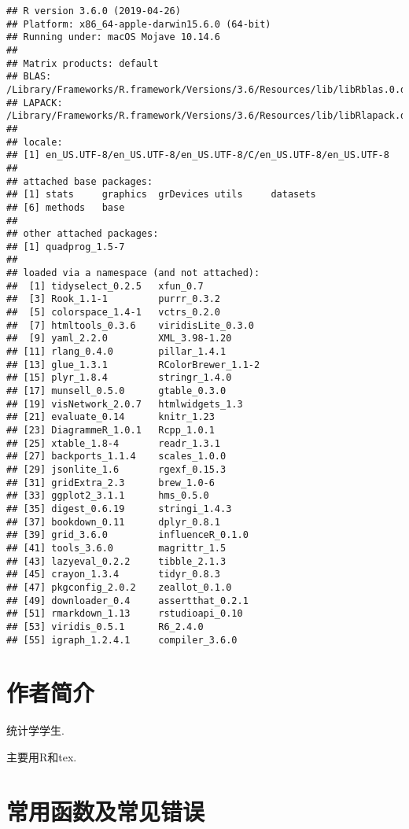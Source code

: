 \documentclass[]{ctexbook}
\begin{document}
\begin{verbatim}
## R version 3.6.0 (2019-04-26)
## Platform: x86_64-apple-darwin15.6.0 (64-bit)
## Running under: macOS Mojave 10.14.6
## 
## Matrix products: default
## BLAS:   /Library/Frameworks/R.framework/Versions/3.6/Resources/lib/libRblas.0.dylib
## LAPACK: /Library/Frameworks/R.framework/Versions/3.6/Resources/lib/libRlapack.dylib
## 
## locale:
## [1] en_US.UTF-8/en_US.UTF-8/en_US.UTF-8/C/en_US.UTF-8/en_US.UTF-8
## 
## attached base packages:
## [1] stats     graphics  grDevices utils     datasets 
## [6] methods   base     
## 
## other attached packages:
## [1] quadprog_1.5-7
## 
## loaded via a namespace (and not attached):
##  [1] tidyselect_0.2.5   xfun_0.7          
##  [3] Rook_1.1-1         purrr_0.3.2       
##  [5] colorspace_1.4-1   vctrs_0.2.0       
##  [7] htmltools_0.3.6    viridisLite_0.3.0 
##  [9] yaml_2.2.0         XML_3.98-1.20     
## [11] rlang_0.4.0        pillar_1.4.1      
## [13] glue_1.3.1         RColorBrewer_1.1-2
## [15] plyr_1.8.4         stringr_1.4.0     
## [17] munsell_0.5.0      gtable_0.3.0      
## [19] visNetwork_2.0.7   htmlwidgets_1.3   
## [21] evaluate_0.14      knitr_1.23        
## [23] DiagrammeR_1.0.1   Rcpp_1.0.1        
## [25] xtable_1.8-4       readr_1.3.1       
## [27] backports_1.1.4    scales_1.0.0      
## [29] jsonlite_1.6       rgexf_0.15.3      
## [31] gridExtra_2.3      brew_1.0-6        
## [33] ggplot2_3.1.1      hms_0.5.0         
## [35] digest_0.6.19      stringi_1.4.3     
## [37] bookdown_0.11      dplyr_0.8.1       
## [39] grid_3.6.0         influenceR_0.1.0  
## [41] tools_3.6.0        magrittr_1.5      
## [43] lazyeval_0.2.2     tibble_2.1.3      
## [45] crayon_1.3.4       tidyr_0.8.3       
## [47] pkgconfig_2.0.2    zeallot_0.1.0     
## [49] downloader_0.4     assertthat_0.2.1  
## [51] rmarkdown_1.13     rstudioapi_0.10   
## [53] viridis_0.5.1      R6_2.4.0          
## [55] igraph_1.2.4.1     compiler_3.6.0
\end{verbatim}

\hypertarget{author}{%
\chapter*{作者简介}\label{author}}


统计学学生.

主要用R和tex.

\mainmatter

\hypertarget{section-2}{%
\chapter{常用函数及常见错误}\label{section-2}}
\end{document}
